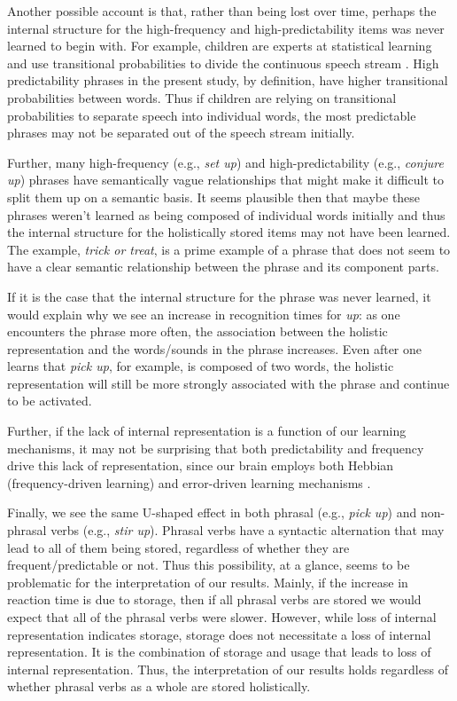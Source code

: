 \documentclass[
  authoryear,
  preprint,
  1p,
  onecolumn]{elsarticle}
\begin{document}
Another possible account is that, rather than being lost over time,
perhaps the internal structure for the high-frequency and
high-predictability items was never learned to begin with. For example,
children are experts at statistical learning and use transitional
probabilities to divide the continuous speech stream
\citep{saffran1996}. High predictability phrases in the present study,
by definition, have higher transitional probabilities between words.
Thus if children are relying on transitional probabilities to separate
speech into individual words, the most predictable phrases may not be
separated out of the speech stream initially.

Further, many high-frequency (e.g., \emph{set up}) and
high-predictability (e.g., \emph{conjure up}) phrases have semantically
vague relationships that might make it difficult to split them up on a
semantic basis. It seems plausible then that maybe these phrases weren't
learned as being composed of individual words initially and thus the
internal structure for the holistically stored items may not have been
learned. The example, \emph{trick or treat}, is a prime example of a
phrase that does not seem to have a clear semantic relationship between
the phrase and its component parts.

If it is the case that the internal structure for the phrase was never
learned, it would explain why we see an increase in recognition times
for \emph{up}: as one encounters the phrase more often, the association
between the holistic representation and the words/sounds in the phrase
increases. Even after one learns that \emph{pick up}, for example, is
composed of two words, the holistic representation will still be more
strongly associated with the phrase and continue to be activated.

Further, if the lack of internal representation is a function of our
learning mechanisms, it may not be surprising that both predictability
and frequency drive this lack of representation, since our brain employs
both Hebbian (frequency-driven learning) and error-driven learning
mechanisms \citep[i.e., predictability-driven
learning,][]{ashby2007, kapatsinski2018}.

Finally, we see the same U-shaped effect in both phrasal (e.g.,
\emph{pick up}) and non-phrasal verbs (e.g., \emph{stir up}). Phrasal
verbs have a syntactic alternation that may lead to all of them being
stored, regardless of whether they are frequent/predictable or not. Thus
this possibility, at a glance, seems to be problematic for the
interpretation of our results. Mainly, if the increase in reaction time
is due to storage, then if all phrasal verbs are stored we would expect
that all of the phrasal verbs were slower. However, while loss of
internal representation indicates storage, storage does not necessitate
a loss of internal representation. It is the combination of storage and
usage that leads to loss of internal representation. Thus, the
interpretation of our results holds regardless of whether phrasal verbs
as a whole are stored holistically.
\end{document}
